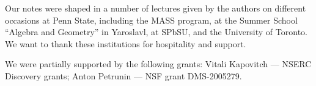 Our notes were shaped in a number of lectures given by the authors
on different occasions at Penn State, including the MASS program,
at the Summer School ``Algebra and Geometry'' in Yaroslavl,
at SPbSU,
and the University of Toronto.
We want to thank these institutions for hospitality and support.

We were partially supported by the following grants:
Vitali Kapovitch ---   NSERC Discovery grants;
Anton Petrunin --- 
NSF grant DMS-2005279. %


